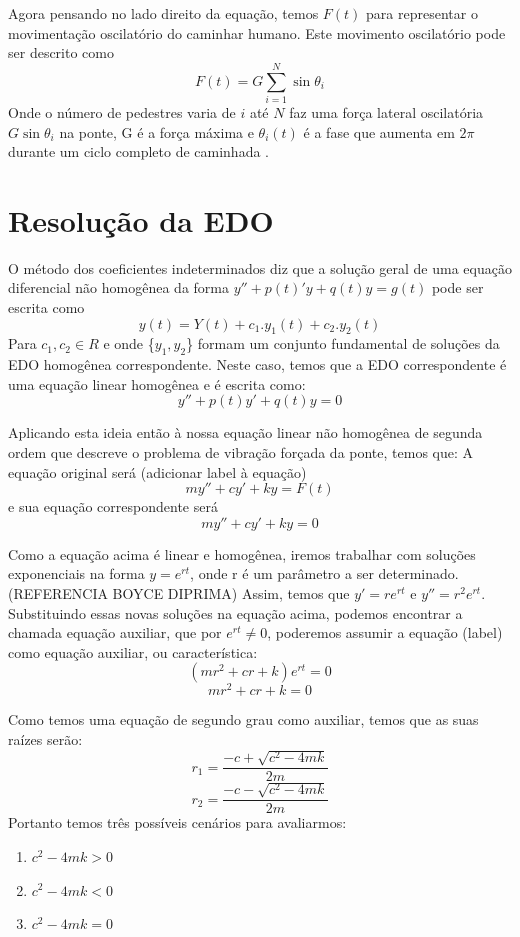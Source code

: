 \documentclass[12pt]{article}
\begin{document}
Agora pensando no lado direito da equação, temos $F(t)$ para representar o movimentação
oscilatório do caminhar humano. Este movimento oscilatório pode ser descrito como 
\begin{equation}
    \label{Synch}
   F(t) = G\sum_{i = 1}^{N}  \sin \theta_i
\end{equation}
Onde o número de pedestres varia de $i$ até $N$ faz uma força 
lateral oscilatória $G\sin\theta_i$ na ponte, G é a força máxima e $\theta_i(t)$
é a fase que aumenta em $2\pi$ durante um ciclo completo de caminhada \cite{crowdSynchrony05}. 

\pagebreak 
\section{Resolução da EDO}
O método dos coeficientes indeterminados diz que a solução geral de uma equação 
diferencial não homogênea
da forma $y'' + p(t)'y + q(t)y = g(t)$ pode ser escrita como
\[ y(t) = Y(t) + c_1.y_1(t) + c_2.y_2(t)\] 
Para $c_1, c_2 \in R$ e onde \{$y_1,y_2$\} formam um conjunto fundamental de soluções
da EDO homogênea correspondente. Neste caso, temos que a EDO correspondente é uma equação
linear homogênea e é escrita como: 
\[y'' + p(t)y' + q(t)y = 0\] 

Aplicando esta ideia então à nossa equação linear não homogênea de segunda ordem que descreve o problema 
de vibração forçada da ponte, temos que:
A equação original será (adicionar label à equação)
\[  my'' + cy'  + ky = F(t)\] 
e sua equação correspondente será
\[ my'' + cy'  + ky = 0\]

Como a equação acima é linear e homogênea, iremos trabalhar com soluções exponenciais na forma $y=e^{rt}$, onde r é um parâmetro a ser determinado. (REFERENCIA BOYCE DIPRIMA)
Assim, temos que $y'=re^{rt}$  e $y''=r^2 e^{rt}$. Substituindo essas novas soluções na equação acima, podemos encontrar a chamada equação auxiliar,
que por $e^{rt}\neq 0$, poderemos assumir a equação (label) como equação auxiliar, ou característica:
\[ (mr^2 + cr  + k)e^{rt} = 0\] 
\[ mr^2 + cr  + k = 0\] 

Como temos uma equação de segundo grau como auxiliar, temos que as suas raízes serão:
\[ r_1 = \frac{-c + \sqrt{c^2 - 4mk}}{2m}\] \[ r_2 = \frac{-c - \sqrt{c^2 - 4mk}}{2m} \]
Portanto temos três possíveis cenários para avaliarmos:
\begin{enumerate}
    \item $c^2 - 4mk > 0$
    \item $c^2 - 4mk < 0$
    \item $c^2 - 4mk = 0$
\end{enumerate}
\end{document}
